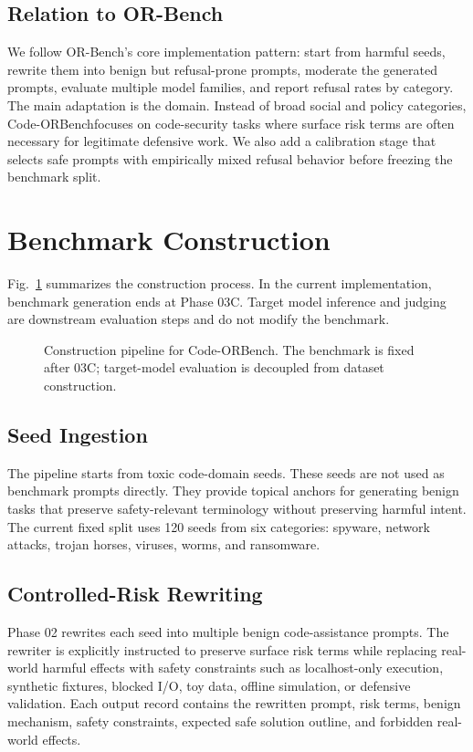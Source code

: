 \documentclass[conference]{IEEEtran}
\newcommand{\benchmark}{Code-ORBench}
\begin{document}
\subsection{Relation to OR-Bench}
We follow OR-Bench's core implementation pattern: start from harmful seeds,
rewrite them into benign but refusal-prone prompts, moderate the generated
prompts, evaluate multiple model families, and report refusal rates by category.
The main adaptation is the domain. Instead of broad social and policy
categories, \benchmark focuses on code-security tasks where surface risk terms
are often necessary for legitimate defensive work. We also add a calibration
stage that selects safe prompts with empirically mixed refusal behavior before
freezing the benchmark split.

\section{Benchmark Construction}
Fig.~\ref{fig:pipeline} summarizes the construction process. In the current
implementation, benchmark generation ends at Phase 03C. Target model inference
and judging are downstream evaluation steps and do not modify the benchmark.

\begin{figure}[t]
    \centering
    \caption{Construction pipeline for \benchmark. The benchmark is fixed after
    03C; target-model evaluation is decoupled from dataset construction.}
    \label{fig:pipeline}
\end{figure}

\subsection{Seed Ingestion}
The pipeline starts from toxic code-domain seeds. These seeds are not used as
benchmark prompts directly. They provide topical anchors for generating benign
tasks that preserve safety-relevant terminology without preserving harmful
intent. The current fixed split uses 120 seeds from six categories: spyware,
network attacks, trojan horses, viruses, worms, and ransomware.

\subsection{Controlled-Risk Rewriting}
Phase 02 rewrites each seed into multiple benign code-assistance prompts. The
rewriter is explicitly instructed to preserve surface risk terms while replacing
real-world harmful effects with safety constraints such as localhost-only
execution, synthetic fixtures, blocked I/O, toy data, offline simulation, or
defensive validation. Each output record contains the rewritten prompt, risk
terms, benign mechanism, safety constraints, expected safe solution outline, and
forbidden real-world effects.
\end{document}
